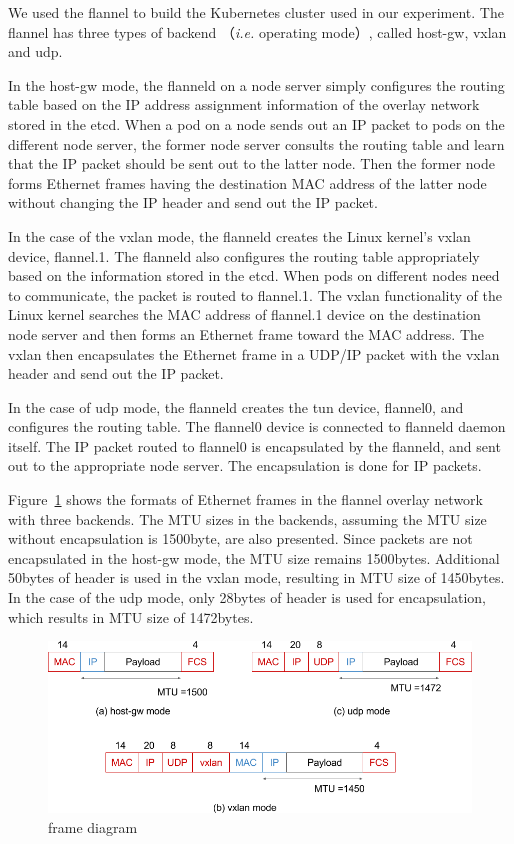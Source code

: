 We used the flannel to build the Kubernetes cluster used in our experiment. 
The flannel has three types of backend （{\it i.e.} operating mode）, called host-gw, vxlan and udp\cite{CoreOSFlannelBackend}.

In the host-gw mode, the flanneld on a node server simply configures the routing table 
based on the IP address assignment information of the overlay network stored in the etcd. 
When a pod on a node sends out an IP packet to pods on the different node server, 
the former node server consults the routing table and learn that the IP packet should be sent out to the latter node.
Then the former node forms Ethernet frames having the destination MAC address of the latter node without changing the IP header and send out the IP packet.

In the case of the vxlan mode, the flanneld creates the Linux kernel's vxlan device, flannel.1. 
The flanneld also configures the routing table appropriately based on the information stored in the etcd.
When pods on different nodes need to communicate, the packet is routed to flannel.1.
The vxlan functionality of the Linux kernel searches the MAC address of flannel.1 device on the destination node server and  
then forms an Ethernet frame toward the MAC address.
The vxlan then encapsulates the Ethernet frame in a UDP/IP packet with the vxlan header and send out the IP packet.

In the case of udp mode, the flanneld creates the tun device, flannel0, and configures the routing table.
The flannel0 device is connected to flanneld daemon itself.
The IP packet routed to flannel0 is encapsulated by the flanneld, and sent out 
to the appropriate node server. 
The encapsulation is done for IP packets.

Figure~\ref{fig:flannel-packet-diagram} shows the formats of Ethernet frames in the flannel overlay network with three backends. 
The MTU sizes in the backends, assuming the MTU size without encapsulation is 1500byte, are also presented.
Since packets are not encapsulated in the host-gw mode, the MTU size remains 1500bytes.
Additional 50bytes of header is used in the vxlan mode, resulting in MTU size of 1450bytes.
In the case of the udp mode, only 28bytes of header is used for encapsulation, which results in MTU size of 1472bytes.

\begin{figure}
\includegraphics[width=\columnwidth]{Figs/flannel-packet-diagram}
\caption{frame diagram}
\label{fig:flannel-packet-diagram}
\end{figure}

